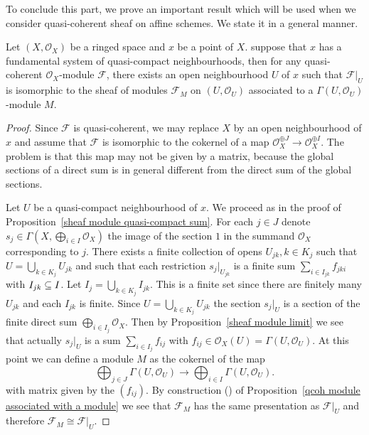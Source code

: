 To conclude this part, we prove an important result which will be used when we consider quasi-coherent sheaf on affine schemes. We state it in a general manner.
\begin{proposition}\label{quasi-coherent sheaf locally module on qc nbhd}
Let $(X,\mathscr{O}_X)$ be a ringed space and $x$ be a point of $X$. suppose that $x$ has a fundamental system of quasi-compact neighbourhoods, then for any quasi-coherent $\mathscr{O}_X$-module $\mathscr{F}$, there exists an open neighbourhood $U$ of $x$ such that $\mathscr{F}|_U$ is isomorphic to the sheaf of modules $\mathscr{F}_M$ on $(U,\mathscr{O}_U)$ associated to a $\Gamma(U,\mathscr{O}_U)$-module $M$.
\end{proposition}
\begin{proof}
Since $\mathscr{F}$ is quasi-coherent, we may replace $X$ by an open neighbourhood of $x$ and assume that $\mathscr{F}$ is isomorphic to the cokernel of a map $\mathscr{O}_X^{\oplus J}\to\mathscr{O}_X^{\oplus I}$. The problem is that this map may not be given by a matrix, because the global sections of a direct sum is in general different from the direct sum of the global sections.\par
Let $U$ be a quasi-compact neighbourhood of $x$. We proceed as in the proof of Proposition~\ref{sheaf module quasi-compact sum}. For each $j\in J$ denote $s_j\in\Gamma(X,\bigoplus_{i\in I}\mathscr{O}_X)$ the image of the section $1$ in the summand $\mathscr{O}_X$ corresponding to $j$. There exists a finite collection of opens $U_{jk},k\in K_j$ such that $U=\bigcup_{k\in K_j}U_{jk}$ and such that each restriction $s_j|_{U_{jk}}$ is a finite sum $\sum_{i\in I_{jk}}f_{jki}$ with $I_{jk}\subseteq I$. Let $I_j=\bigcup_{k\in K_j}I_{jk}$. This is a finite set since there are finitely many $U_{jk}$ and each $I_{jk}$ is finite. Since $U=\bigcup_{k\in K_j}U_{jk}$ the section $s_j|_U$ is a section of the finite direct sum $\bigoplus_{i\in I_j}\mathscr{O}_X$. Then by Proposition~\ref{sheaf module limit} we see that actually $s_j|_U$ is a sum $\sum_{i\in I_j}f_{ij}$ with $f_{ij}\in\mathscr{O}_X(U)=\Gamma(U,\mathscr{O}_U)$. At this point we can define a module $M$ as the cokernel of the map
\[\bigoplus_{j\in J}\Gamma(U,\mathscr{O}_U)\to\bigoplus_{i\in I}\Gamma(U,\mathscr{O}_U).\]
with matrix given by the $(f_{ij})$. By construction () of Proposition~\ref{qcoh module associated with a module} we see that $\mathscr{F}_M$ has the same presentation as $\mathscr{F}|_U$ and therefore $\mathscr{F}_M\cong\mathscr{F}|_U$.
\end{proof}
